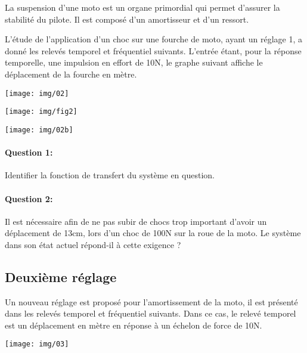 \begin{minipage}{0.58\linewidth}
La suspension d'une moto est un organe primordial qui permet d'assurer la stabilité du pilote. Il est composé d'un amortisseur et d'un ressort.

L'étude de l'application d'un choc sur une fourche de moto, ayant un réglage 1, a donné les relevés temporel et fréquentiel suivants. L'entrée étant, pour la réponse temporelle, une impulsion en effort de 10N, le graphe suivant affiche le déplacement de la fourche en mètre.

\begin{center}
 \texttt{[image: img/02]}
\end{center}

\end{minipage}\hfill
\begin{minipage}{0.38\linewidth}
\begin{center}
 \texttt{[image: img/fig2]}
\end{center}
\end{minipage}

\begin{center}
 \texttt{[image: img/02b]}
\end{center}

\paragraph{Question 1:} Identifier la fonction de transfert du système en question.

\paragraph{Question 2:} Il est nécessaire afin de ne pas subir de chocs trop important d'avoir un déplacement de 13cm, lors d'un choc de 100N sur la roue de la moto. Le système dans son état actuel répond-il à cette exigence ?

\subsection{Deuxième réglage}

Un nouveau réglage est proposé pour l'amortissement de la moto, il est présenté dans les relevés temporel et fréquentiel suivants. Dans ce cas, le relevé temporel est un déplacement en mètre en réponse à un échelon de force de 10N.

\begin{center}
 \texttt{[image: img/03]}
\end{center}

